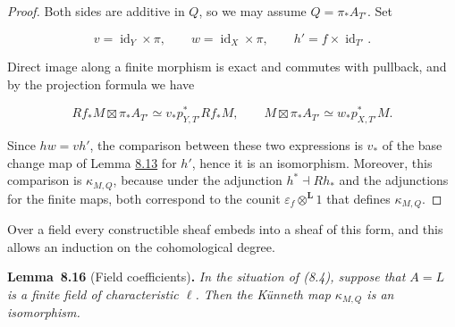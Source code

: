 \documentclass[11pt]{article}
\newenvironment{bpstatement}[2]{\par\addvspace{0.6\baselineskip}\noindent\textbf{#1}#2\textbf{.}\enspace\ignorespaces}
  {\par\addvspace{0.4\baselineskip}}
\newenvironment{bpstatementit}[2]{\begin{bpstatement}{#1}{#2}\itshape\ignorespaces}{\end{bpstatement}}
\begin{document}
\begin{proof}[{Proof}]\label{bp57}%
Both sides are additive in \(Q\), so we may assume \(Q=\pi_*A_{T'}\). Set

\[
v=\operatorname{id}_Y\times\pi,\qquad
w=\operatorname{id}_X\times\pi,\qquad
h'=f\times\operatorname{id}_{T'}.
\]

Direct image along a finite morphism is exact and commutes with pullback, and by the projection formula we have

\[
Rf_*M\boxtimes\pi_*A_{T'}
\simeq v_*p_{Y,T'}^*Rf_*M,
\qquad
M\boxtimes\pi_*A_{T'}\simeq w_*p_{X,T'}^*M.
\]

Since \(hw=vh'\), the comparison between these two expressions is \(v_*\) of the base change map of Lemma \hyperref[bp51]{8.13} for \(h'\), hence it is an isomorphism. Moreover, this comparison is \(\kappa_{M,Q}\), because under the adjunction \(h^*\dashv Rh_*\) and the adjunctions for the finite maps, both correspond to the counit \(\varepsilon_f\otimes^{\mathbf L}1\) that defines \(\kappa_{M,Q}\).
\end{proof}

\label{bp58}%
Over a field every constructible sheaf embeds into a sheaf of this form, and this allows an induction on the cohomological degree.

\label{bp59}%
\begin{bpstatementit}{Lemma~8.16}{ (Field coefficients)}
In the situation of (8.4), suppose that \(A=L\) is a finite field of characteristic \(\ell\). Then the Künneth map \(\kappa_{M,Q}\) is an isomorphism.
\end{bpstatementit}
\end{document}
